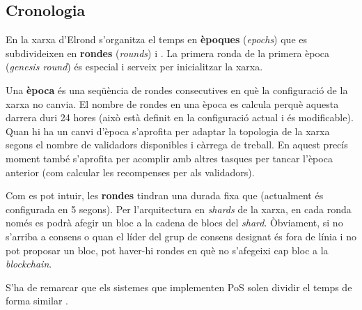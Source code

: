 \documentclass[11pt,a4paper]{article}
\begin{document}
\subsection{Cronologia}
En la xarxa d'Elrond s'organitza el temps en \textbf{èpoques} (\textit{epochs}) que es subdivideixen en \textbf{rondes} (\textit{rounds}) i \cite{elrond2022}. La primera ronda de la primera època (\textit{genesis round}) és especial i serveix per inicialitzar la xarxa.

Una \textbf{època} és una seqüència de rondes consecutives en què la configuració de la xarxa no canvia. El nombre de rondes en una època es calcula perquè aquesta darrera duri 24 hores (això està definit en la configuració actual i és modificable). Quan hi ha un canvi d'època s'aprofita per adaptar la topologia de la xarxa segons el nombre de validadors disponibles i càrrega de treball. En aquest precís moment també s'aprofita per acomplir amb altres tasques per tancar l'època anterior (com calcular les recompenses per als validadors).

Com es pot intuir, les \textbf{rondes} tindran una durada fixa que (actualment és configurada en 5 segons). Per l'arquitectura en \textit{shards} de la xarxa, en cada ronda només es podrà afegir un bloc a la cadena de blocs del \textit{shard}. Òbviament, si no s'arriba a consens o quan el líder del grup de consens designat és fora de línia i no pot proposar un bloc, pot haver-hi rondes en què no s'afegeixi cap bloc a la \textit{blockchain}.

S'ha de remarcar que els sistemes que implementen PoS solen dividir el temps de forma similar \cite{elrond2019}.
\end{document}

